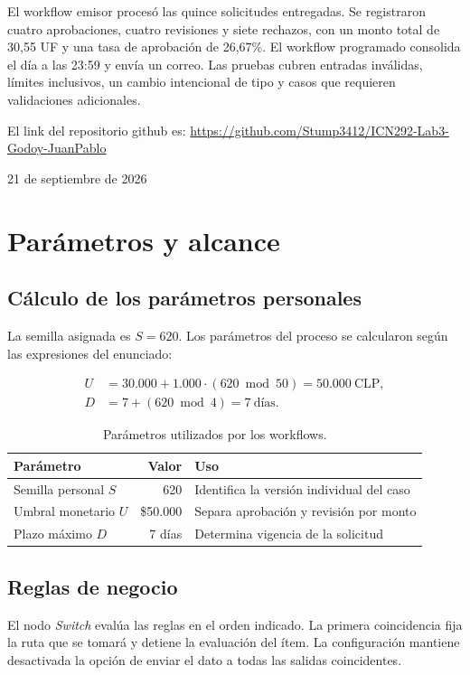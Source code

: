 \documentclass[11pt,letterpaper]{article}
\begin{document}
El workflow emisor procesó las quince solicitudes entregadas. Se registraron cuatro aprobaciones, cuatro revisiones y siete rechazos, con un monto total de 30,55 UF y una tasa de aprobación de 26,67\%. El workflow programado consolida el día a las 23:59 y envía un correo. Las pruebas cubren entradas inválidas, límites inclusivos, un cambio intencional de tipo y casos que requieren validaciones adicionales.

El link del repositorio github es: \url{https://github.com/Stump3412/ICN292-Lab3-Godoy-JuanPablo}

\vfill
\begin{center}
    21 de septiembre de 2026
\end{center}

\clearpage

\section{Parámetros y alcance}

\subsection{Cálculo de los parámetros personales}
La semilla asignada es $S=620$. Los parámetros del proceso se calcularon según las expresiones del enunciado:

\begin{align*}
U &= 30.000 + 1.000\cdot (620 \bmod 50) = 50.000\ \text{CLP},\\
D &= 7 + (620 \bmod 4) = 7\ \text{días}.
\end{align*}

\begin{table}[H]
\centering
\caption{Parámetros utilizados por los workflows.}
\begin{tabular}{p{}rp{}}
\toprule
\textbf{Parámetro} & \textbf{Valor} & \textbf{Uso} \\
\midrule
Semilla personal $S$ & 620 & Identifica la versión individual del caso \\
Umbral monetario $U$ & \$50.000 & Separa aprobación y revisión por monto \\
Plazo máximo $D$ & 7 días & Determina vigencia de la solicitud \\
\bottomrule
\end{tabular}
\end{table}

\subsection{Reglas de negocio}
El nodo \textit{Switch} evalúa las reglas en el orden indicado. La primera coincidencia fija la ruta que se tomará y detiene la evaluación del ítem. La configuración mantiene desactivada la opción de enviar el dato a todas las salidas coincidentes.
\end{document}
